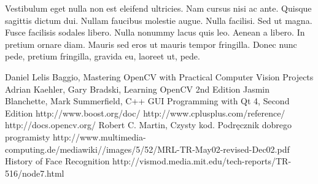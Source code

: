 \documentclass[eng,printmode]{mgr}
\begin{document}
Vestibulum eget nulla non est eleifend ultricies. Nam cursus nisi ac ante. Quisque sagittis dictum dui. Nullam faucibus molestie augue. Nulla facilisi. Sed ut magna. Fusce facilisis sodales libero. Nulla nonummy lacus quis leo. Aenean a libero. In pretium ornare diam. Mauris sed eros ut mauris tempor fringilla. Donec nunc pede, pretium fringilla, gravida eu, laoreet ut, pede.
\begin{thebibliography}{12}

 Daniel Lelis Baggio, Mastering OpenCV with Practical Computer Vision Projects
 Adrian Kaehler, Gary Bradski, Learning OpenCV 2nd Edition
 Jasmin Blanchette, Mark Summerfield, C++ GUI Programming with Qt 4, Second Edition
 http://www.boost.org/doc/
 http://www.cplusplus.com/reference/
 http://docs.opencv.org/
 Robert C. Martin, Czysty kod. Podręcznik dobrego programisty
 http://www.multimedia-computing.de/mediawiki//images/5/52/MRL-TR-May02-revised-Dec02.pdf
 History of Face Recognition http://vismod.media.mit.edu/tech-reports/TR-516/node7.html
\end{thebibliography}

\end{document}
